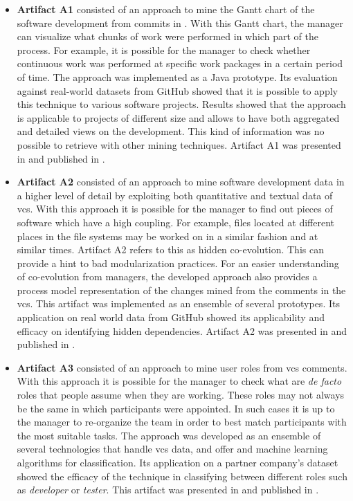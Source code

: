 \begin{itemize}
	\item \textbf{Artifact A1} consisted of an approach to mine the Gantt chart of the software development from commits in . With this Gantt chart, the manager can visualize what chunks of work were performed in which part of the process. For example, it is possible for the manager to check whether continuous work was performed at specific work packages in a certain period of time. 
	The approach was implemented as a Java prototype. Its evaluation against real-world datasets from GitHub showed that it is possible to apply this technique to various software projects. Results showed that the  approach is applicable to projects of different size and allows to have both aggregated and detailed views on the development. This kind of information was no possible to retrieve with other mining techniques. Artifact A1 was presented in  and published in \cite{DBLP:conf/bpm/BalaCMRP15}.
	
	\item \textbf{Artifact A2} consisted of an approach to mine software development data in a higher level of detail by exploiting both quantitative and textual data of \gls{vcs}. With this approach it is possible for the manager to find out pieces of software which have a high coupling. For example, files located at different places in the file systems may be worked on in a similar fashion and at similar times. Artifact A2 refers to this as hidden co-evolution. This can provide a hint to bad modularization practices. For an easier understanding of co-evolution from managers, the developed approach also provides a process model representation of the changes mined from the comments in the \gls{vcs}. This artifact was implemented as an ensemble of several prototypes. Its application on real world data from GitHub showed its applicability and efficacy on identifying hidden dependencies. Artifact A2 was presented in  and published in \cite{DBLP:conf/bpm/BalaRGBMS17}.
	
	\item \textbf{Artifact A3} consisted of an approach to mine user roles from \gls{vcs} comments. With this approach it is possible for the manager to check what are \emph{de facto} roles that people assume when they are working.  These roles may not always be the same in which participants were appointed. In such cases it is up to the manager to re-organize the team in order to best match participants with the most suitable tasks. The approach was developed as an ensemble of several technologies that handle \gls{vcs} data, and offer  and machine learning algorithms for classification. Its application on a partner company's dataset showed the efficacy of the technique in classifying between different roles such as \emph{developer} or \emph{tester}. This artifact was presented in  and published in \cite{DBLP:conf/edoc/AgrawalATBRT16}.
	

\end{itemize}
